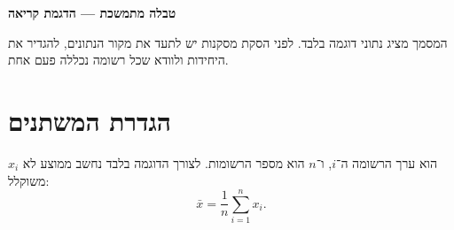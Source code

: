 \def\lakitdocumentclass{article}
\def\lakitclassoptions{11pt,a4paper}
\def\lakitgeometryoptions{margin=2.2cm,headheight=14pt}
\def\lakitlinespread{1.16}





{\LARGE\sffamily\bfseries\noindent טבלה מתמשכת — הדגמת קריאה\par}\medskip
המסמך מציג נתוני דוגמה בלבד. לפני הסקת מסקנות יש לתעד את מקור הנתונים,
להגדיר את היחידות ולוודא שכל רשומה נכללה פעם אחת.
\section{הגדרת המשתנים}
$x_i$ הוא ערך הרשומה ה־$i$, ו־$n$ הוא מספר הרשומות. לצורך הדוגמה בלבד
נחשב ממוצע לא משוקלל:
\begin{equation}\label{eq:mean}
\bar{x}=\frac{1}{n}\sum_{i=1}^{n}x_i.
\end{equation}
